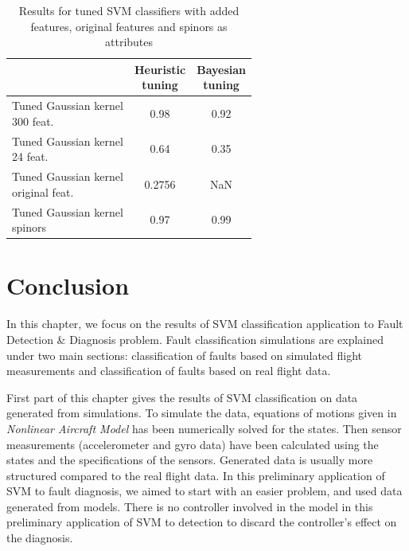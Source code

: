 \begin{table}[hbt!]
\caption{\label{tab:GaussianTuned} Results for tuned SVM classifiers with added features, original features and spinors as attributes}
\centering
\begin{tabular}{lcc}
\hline
& \makecell{ Heuristic\\ tuning} & \makecell{ Bayesian\\ tuning}\\\hline
 \makecell{Tuned Gaussian kernel \\ 300 feat.} & 0.98 & 0.92 \\
 \makecell{Tuned Gaussian kernel \\ 24 feat.} & 0.64 & 0.35 \\
 \makecell{Tuned Gaussian kernel \\ original feat.}  & 0.2756 & NaN\\
  \makecell{Tuned Gaussian kernel \\ spinors} & 0.97 & 0.99 \\
\hline
\end{tabular}
\end{table}

\section{Conclusion}

In this chapter, we focus on the results of SVM classification application to Fault Detection \& Diagnosis problem. Fault classification simulations are explained under two main sections: classification of faults based on simulated flight measurements and classification of faults based on real flight data. 

First part of this chapter gives the results of SVM classification on data generated from simulations. 
To simulate the data, equations of motions given in \emph{Nonlinear Aircraft Model} has been numerically solved for the states. 
Then sensor measurements (accelerometer and gyro data) have been calculated using the states and the specifications of the sensors. 
Generated data is usually more structured compared to the real flight data. 
In this preliminary application of SVM to fault diagnosis, we aimed to start with an easier problem, and used data generated from models.
There is no controller involved in the model in this preliminary application of SVM to detection to discard the controller's effect on the diagnosis. 

